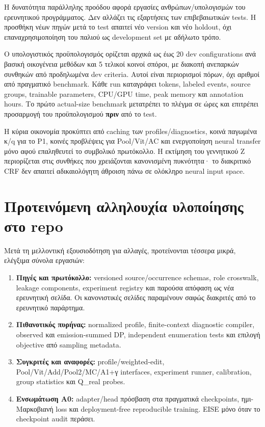 \documentclass[
  10pt,
  a4paper,
]{report}
\providecommand{\tightlist}{%
  \setlength{\itemsep}{0pt}\setlength{\parskip}{0pt}}
\begin{document}
Η δυνατότητα παράλληλης προόδου αφορά εργασίες ανθρώπων/υπολογισμών του
ερευνητικού προγράμματος. Δεν αλλάζει τις εξαρτήσεις των επιβεβαιωτικών
tests. Η προσθήκη νέων πηγών μετά το test απαιτεί νέο version και νέο
holdout, όχι επαναχρησιμοποίηση του παλιού ως development set με αδήλωτο
τρόπο.

Ο υπολογιστικός προϋπολογισμός ορίζεται αρχικά ως έως 20 dev
configurations ανά βασική οικογένεια μεθόδων και 5 τελικοί κοινοί
σπόροι, με διακοπή ανεπαρκών συνθηκών από προδηλωμένα dev criteria.
Αυτοί είναι περιορισμοί πόρων, όχι αριθμοί από πραγματικό benchmark.
Κάθε run καταγράφει tokens, labeled events, source groups, trainable
parameters, CPU/GPU time, peak memory και annotation hours. Το πρώτο
actual-size benchmark μετατρέπει το πλέγμα σε ώρες και επιτρέπει
προσαρμογή του προϋπολογισμού \textbf{πριν} από το test.

Η κύρια οικονομία προκύπτει από caching των profiles/diagnostics, κοινά
παγωμένα κ/q για το P1, κοινές προβλέψεις για Pool/Vit/AC και
ενεργοποίηση neural transfer μόνο αφού επαληθευτεί το συμβολικό
πρωτόκολλο. Η εκτίμηση του γεννητικού Z περιορίζεται στις συνθήκες που
χρειάζονται κανονισμένη πυκνότητα· το διακριτικό CRF δεν απαιτεί
αδικαιολόγητη άθροιση πάνω σε ολόκληρο neural input space.

\section{Προτεινόμενη αλληλουχία υλοποίησης στο
repo}\label{ux3c0ux3c1ux3bfux3c4ux3b5ux3b9ux3bdux3ccux3bcux3b5ux3bdux3b7-ux3b1ux3bbux3bbux3b7ux3bbux3bfux3c5ux3c7ux3afux3b1-ux3c5ux3bbux3bfux3c0ux3bfux3afux3b7ux3c3ux3b7ux3c2-ux3c3ux3c4ux3bf-repo}

Μετά τη μελλοντική εξουσιοδότηση για αλλαγές, προτείνονται τέσσερα
μικρά, ελέγξιμα σύνολα εργασιών:

\begin{enumerate}
\def\labelenumi{\arabic{enumi}.}
\tightlist
\item
  \textbf{Πηγές και πρωτόκολλο:} versioned source/occurrence schemas,
  role crosswalk, leakage components, experiment registry και παρούσα
  απόφαση ως νέα ερευνητική σελίδα. Οι κανονιστικές σελίδες παραμένουν
  σαφώς διακριτές από το ερευνητικό παράρτημα.
\item
  \textbf{Πιθανοτικός πυρήνας:} normalized profile, finite-context
  diagnostic compiler, observed και emission-summed DP, independent
  enumeration tests και επιλογή objective από sampling metadata.
\item
  \textbf{Συγκριτές και αναφορές:} profile/weighted-edit,
  Pool/Vit/Add/Pool2/MC/A1+γ interfaces, experiment runner, calibration,
  group statistics και Q\_real probes.
\item
  \textbf{Ενσωμάτωση A0:} adapter/head πρόσβαση στα πραγματικά
  checkpoints, ημι-Μαρκοβιανή loss και deployment-free reproducible
  training. EISE μόνο όταν το checkpoint audit περάσει.
\end{enumerate}
\end{document}
